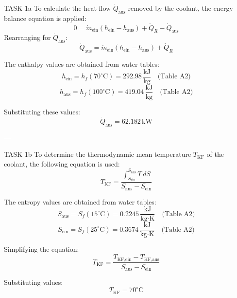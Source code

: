 TASK 1a  
To calculate the heat flow \( \dot{Q}_{\text{aus}} \) removed by the coolant, the energy balance equation is applied:  
\[
0 = \dot{m}_{\text{ein}} \left( h_{\text{ein}} - h_{\text{aus}} \right) + \dot{Q}_R - \dot{Q}_{\text{aus}}
\]  
Rearranging for \( \dot{Q}_{\text{aus}} \):  
\[
\dot{Q}_{\text{aus}} = \dot{m}_{\text{ein}} \left( h_{\text{ein}} - h_{\text{aus}} \right) + \dot{Q}_R
\]  

The enthalpy values are obtained from water tables:  
\[
h_{\text{ein}} = h_f(70^\circ\text{C}) = 292.98 \, \frac{\text{kJ}}{\text{kg}} \quad \text{(Table A2)}
\]  
\[
h_{\text{aus}} = h_f(100^\circ\text{C}) = 419.04 \, \frac{\text{kJ}}{\text{kg}} \quad \text{(Table A2)}
\]  

Substituting these values:  
\[
\dot{Q}_{\text{aus}} = 62.182 \, \text{kW}
\]  

---

TASK 1b  
To determine the thermodynamic mean temperature \( T_{\text{KF}} \) of the coolant, the following equation is used:  
\[
T_{\text{KF}} = \frac{\int_{S_{\text{ein}}}^{S_{\text{aus}}} T \, dS}{S_{\text{aus}} - S_{\text{ein}}}
\]  

The entropy values are obtained from water tables:  
\[
S_{\text{aus}} = S_f(15^\circ\text{C}) = 0.2245 \, \frac{\text{kJ}}{\text{kg·K}} \quad \text{(Table A2)}
\]  
\[
S_{\text{ein}} = S_f(25^\circ\text{C}) = 0.3674 \, \frac{\text{kJ}}{\text{kg·K}} \quad \text{(Table A2)}
\]  

Simplifying the equation:  
\[
T_{\text{KF}} = \frac{T_{\text{KF,ein}} - T_{\text{KF,aus}}}{S_{\text{aus}} - S_{\text{ein}}}
\]  

Substituting values:  
\[
T_{\text{KF}} = 70^\circ\text{C}
\]